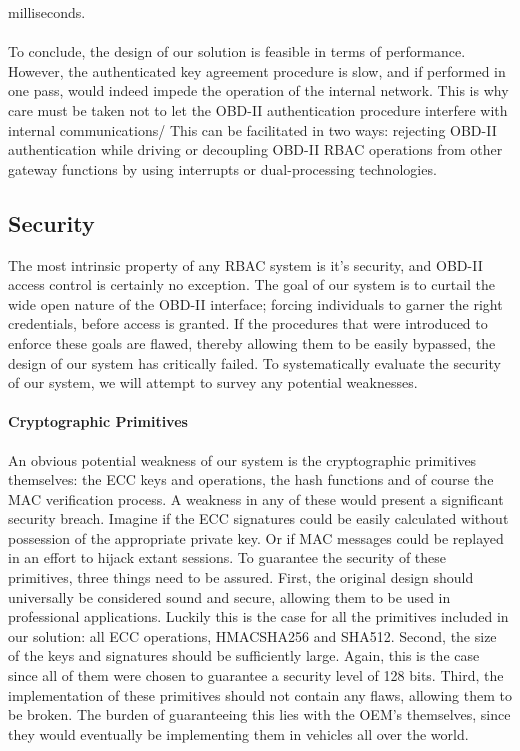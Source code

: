 milliseconds. \\ \\ To conclude, the design of our solution is feasible in terms of performance. However, the authenticated key agreement procedure is slow, and if performed in one pass, would indeed impede the operation of the internal network. This is why care must be taken not to let the OBD-II authentication procedure interfere with internal communications/ This can be facilitated in two ways: rejecting OBD-II authentication while driving or decoupling OBD-II RBAC operations from other gateway functions by using interrupts or dual-processing technologies. 


\subsection{Security}
\label{sec:security}

The most intrinsic property of any RBAC system is it's security, and OBD-II access control is certainly no exception. The goal of our system is to curtail the wide open nature of the OBD-II interface; forcing individuals to garner the right credentials, before access is granted. If the procedures that were introduced to enforce these goals are flawed, thereby allowing them to be easily bypassed, the design of our system has critically failed. To systematically evaluate the security of our system, we will attempt to survey any potential weaknesses.


\paragraph{Cryptographic Primitives} An obvious potential weakness of our system is the cryptographic primitives themselves: the ECC keys and operations, the hash functions and of course the MAC verification process. A weakness in any of these would present a significant security breach. Imagine if the ECC signatures could be easily calculated without possession of the appropriate private key. Or if MAC messages could be replayed in an effort to hijack extant sessions. To guarantee the security of these primitives, three things need to be assured. First, the original design should universally be considered sound and secure, allowing them to be used in professional applications. Luckily this is the case for all the primitives included in our solution: all ECC operations, HMAC\textunderscore SHA256 and SHA512. Second, the size of the keys and signatures should be sufficiently large. Again, this is the case since all of them were chosen to guarantee a security level of 128 bits. Third, the implementation of these primitives should not contain any flaws, allowing them to be broken. The burden of guaranteeing this lies with the OEM's themselves, since they would eventually be implementing them in vehicles all over the world. 

